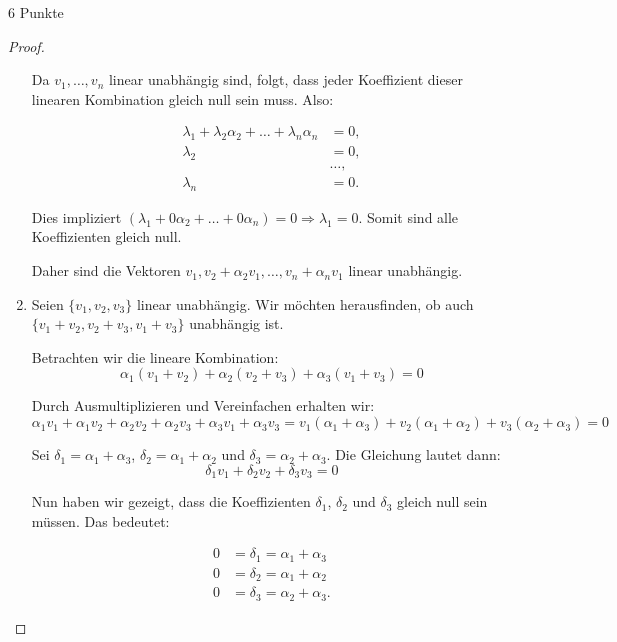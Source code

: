 \documentclass{problemset}
\begin{document}
\begin{problem}{6 Punkte}
\begin{proof}
\begin{enumerate}
              Da $v_1, \ldots, v_n$ linear unabhängig sind, folgt, dass jeder Koeffizient
              dieser linearen Kombination gleich null sein muss. Also:

              \begin{align*}
                  \lambda_1 + \lambda_2\alpha_2 + \ldots + \lambda_n\alpha_n & = 0,    \\
                  \lambda_2                                                  & = 0,    \\
                                                                             & \ldots, \\
                  \lambda_n                                                  & = 0.
              \end{align*}

              Dies impliziert $(\lambda_1 + 0\alpha_2 + \ldots + 0\alpha_n) = 0 \Rightarrow
                  \lambda_1 = 0$. Somit sind alle Koeffizienten gleich null.

              Daher sind die Vektoren $v_1, v_2 + \alpha_2v_1, \ldots, v_n + \alpha_nv_1$
              linear unabhängig.

        \item Seien \(\{v_1, v_2, v_3\}\) linear unabhängig. Wir möchten herausfinden, ob
              auch \(\{v_1+v_2, v_2+v_3, v_1+v_3\}\) unabhängig ist.

              Betrachten wir die lineare Kombination:
              \[
                  \alpha_1(v_1+v_2) + \alpha_2(v_2+v_3) + \alpha_3(v_1+v_3) = 0
              \]

              Durch Ausmultiplizieren und Vereinfachen erhalten wir:
              \[
                  \alpha_1v_1 + \alpha_1v_2 + \alpha_2v_2 + \alpha_2v_3 + \alpha_3v_1 + \alpha_3v_3 = v_1(\alpha_1+\alpha_3) + v_2(\alpha_1+\alpha_2) + v_3(\alpha_2+\alpha_3) = 0
              \]

              Sei \(\delta_1 = \alpha_1 + \alpha_3\), \(\delta_2 = \alpha_1 + \alpha_2\) und
              \(\delta_3 = \alpha_2 + \alpha_3\). Die Gleichung lautet dann:
              \[
                  \delta_1v_1 + \delta_2v_2 + \delta_3v_3 = 0
              \]

              Nun haben wir gezeigt, dass die Koeffizienten \(\delta_1\), \(\delta_2\) und
              \(\delta_3\) gleich null sein müssen. Das bedeutet:

              \begin{align*}
                  0 & = \delta_1 = \alpha_1 + \alpha_3  \\
                  0 & = \delta_2 = \alpha_1 + \alpha_2  \\
                  0 & = \delta_3 = \alpha_2 + \alpha_3.
              \end{align*}


\end{enumerate}
\end{proof}
\end{problem}
\end{document}

